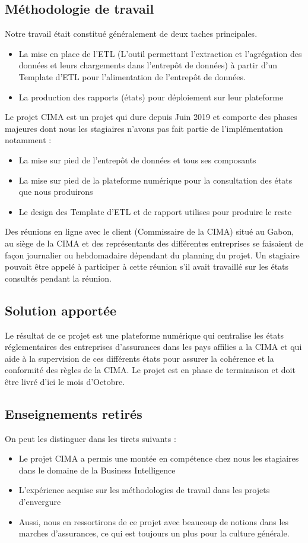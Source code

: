 \subsection{Méthodologie de travail}
Notre travail était constitué généralement de deux taches principales. 
\begin{itemize}
    \item La mise en place de l’ETL (L’outil permettant l’extraction et l’agrégation des données et leurs chargements dans l’entrepôt de données) à partir d’un Template d’ETL pour l’alimentation de l’entrepôt de données.
    \item La production des rapports (états) pour déploiement sur leur plateforme
\end{itemize}

Le projet CIMA est un projet qui dure depuis Juin 2019 et comporte des phases majeures dont nous les stagiaires n’avons pas fait partie de l’implémentation notamment :
\begin{itemize}
    \item La mise sur pied de l’entrepôt de données et tous ses composants
    \item La mise sur pied de la plateforme numérique pour la consultation des états que nous produirons
    \item Le design des Template d’ETL et de rapport utilises pour produire le reste
\end{itemize}
Des réunions en ligne avec le client (Commissaire de la CIMA) situé au Gabon, au siège de la CIMA et des représentants des différentes entreprises se faisaient de façon journalier ou hebdomadaire dépendant du planning du projet. Un stagiaire pouvait être appelé à participer à cette réunion s’il avait travaillé sur les états consultés pendant la réunion. 


\subsection{Solution apportée}

Le résultat de ce projet est une plateforme numérique qui centralise les états réglementaires des entreprises d’assurances dans les pays affilies a la CIMA et qui aide à la supervision de ces différents états pour assurer la cohérence et la conformité des règles de la CIMA. Le projet est en phase de terminaison et doit être livré d’ici le mois d’Octobre.

\subsection{Enseignements retirés}
On peut les distinguer dans les tirets suivants : 
\begin{itemize}
    \item Le projet CIMA a permis une montée en compétence chez nous les stagiaires dans le domaine de la Business Intelligence
    \item L’expérience acquise sur les méthodologies de travail dans les projets d’envergure
    \item Aussi, nous en ressortirons de ce projet avec beaucoup de notions dans les marches d’assurances, ce qui est toujours un plus pour la culture générale.
\end{itemize}


